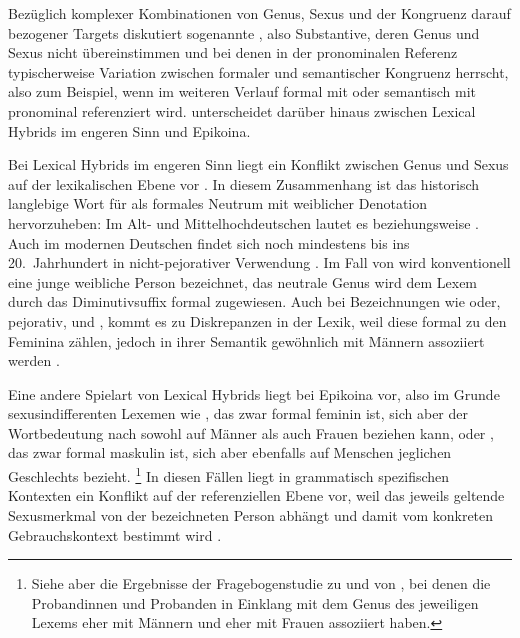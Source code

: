 Bezüglich komplexer Kombinationen von Genus, Sexus und der Kongruenz darauf
bezogener Targets diskutiert \textcite[183--184]{corbett1991} sogenannte
, also Substantive, deren Genus und Sexus nicht
übereinstimmen und bei denen in der pronominalen Referenz typischerweise
Variation zwischen formaler und semantischer Kongruenz herrscht, also zum
Beispiel, wenn  im weiteren Verlauf formal mit  oder
semantisch mit  pronominal referenziert wird. \citet{klein2022}
unterscheidet darüber hinaus zwischen Lexical Hybrids im engeren Sinn und
Epikoina.

Bei Lexical Hybrids im engeren Sinn liegt ein Konflikt zwischen Genus und Sexus
auf der lexikalischen Ebene vor \autocite[145]{klein2022}. In diesem
Zusammenhang ist das historisch langlebige Wort für  als formales
Neutrum mit weiblicher Denotation hervorzuheben: Im Alt- und
Mittelhochdeutschen lautet es  beziehungsweise . Auch im
modernen Deutschen findet sich  noch mindestens bis ins
20.~Jahrhundert in nicht-pejorativer Verwendung \autocite[166]{fleischer2012}.
Im Fall von  wird konventionell eine junge weibliche Person
bezeichnet, das neutrale Genus wird dem Lexem durch das Diminutivsuffix
 formal zugewiesen. Auch bei Bezeichnungen wie  oder,
pejorativ,  und , kommt es zu Diskrepanzen in der
Lexik, weil diese formal zu den Feminina zählen, jedoch in ihrer Semantik
gewöhnlich mit Männern assoziiert werden
\autocite[vgl.~auch][67--68]{panther2009}.

Eine andere Spielart von Lexical Hybrids liegt bei Epikoina vor, also im Grunde
sexus\-indifferenten Lexemen wie , das zwar formal feminin ist, sich
aber der Wortbedeutung nach sowohl auf Männer als auch Frauen beziehen kann,
oder , das zwar formal maskulin ist, sich aber ebenfalls auf
Menschen jeglichen Geschlechts bezieht.%
%
	\footnote{Siehe aber die Ergebnisse der Fragebogenstudie zu
		 und  von \citet[174--183]{klein2022}, bei denen
		die Probandinnen und Probanden in Einklang mit dem Genus des jeweiligen
		Lexems  eher mit Männern und  eher mit Frauen
		assoziiert haben.}
%
In diesen Fällen liegt in grammatisch spezifischen Kontexten ein Konflikt auf
der referenziellen Ebene vor, weil das jeweils geltende Sexusmerkmal von der
bezeichneten Person abhängt und damit vom konkreten Gebrauchskontext bestimmt
wird \autocite[142--144]{klein2022}.

